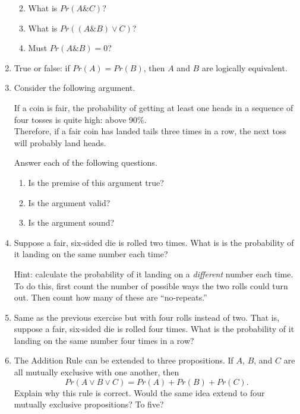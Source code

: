 \documentclass[justified]{tufte-book}
\providecommand{\tightlist}{%
  \setlength{\itemsep}{0pt}\setlength{\parskip}{0pt}}
\renewcommand{\wedge}{\mathbin{\&}}
\newcommand{\p}{Pr}
\theoremstyle{definition}
\theoremstyle{definition}
\theoremstyle{definition}
\theoremstyle{definition}
\theoremstyle{remark}
\begin{document}
\begin{enumerate}
  \begin{enumerate}
  \def\labelenumii{\alph{enumii}.}
  \tightlist
  \item
    What is \(\p(A \wedge C)\)?
  \item
    What is \(\p((A \wedge B) \vee C)\)?
  \item
    Must \(\p(A \wedge B) = 0\)?
  \end{enumerate}
\item
  True or false: if \(\p(A)=\p(B)\), then \(A\) and \(B\) are logically equivalent.
\item
  Consider the following argument.

  \begin{argument}
   If a coin is fair, the probability of getting at least one heads in a
   sequence of four tosses is quite high: above 90\%.\\
   Therefore, if a fair coin has landed tails three times in a row, the
   next toss will probably land heads.
   \end{argument}

  Answer each of the following questions.

  \begin{enumerate}
  \def\labelenumii{\alph{enumii}.}
  \tightlist
  \item
    Is the premise of this argument true?
  \item
    Is the argument valid?
  \item
    Is the argument sound?
  \end{enumerate}
\item
  Suppose a fair, six-sided die is rolled two times. What is is the probability of it landing on the same number each time?

  Hint: calculate the probability of it landing on a \emph{different} number each time. To do this, first count the number of possible ways the two rolls could turn out. Then count how many of these are ``no-repeats.''
\item
  Same as the previous exercise but with four rolls instead of two. That is, suppose a fair, six-sided die is rolled four times. What is the probability of it landing on the same number four times in a row?
\item
  The Addition Rule can be extended to three propositions. If \(A\), \(B\), and \(C\) are all mutually exclusive with one another, then
  \[ \p(A \vee B \vee C) = \p(A) + \p(B) + \p(C).\]
  Explain why this rule is correct. Would the same idea extend to four mutually exclusive propositions? To five?


\end{enumerate}
\end{document}
